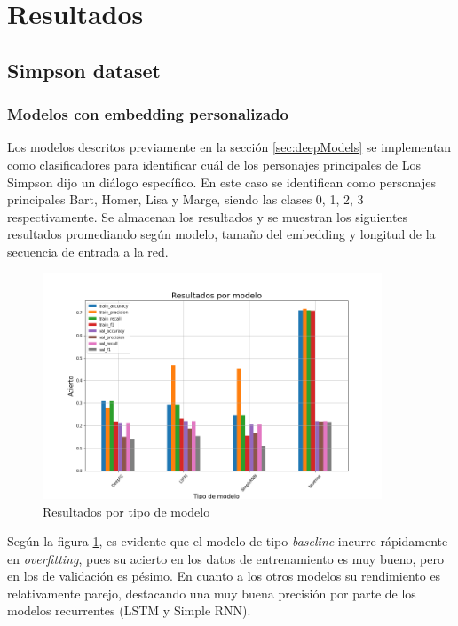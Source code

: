 \section{Resultados}

\subsection{Simpson dataset}

\subsubsection{Modelos con embedding personalizado}

Los modelos descritos previamente en la sección \ref{sec:deepModels} se implementan como clasificadores para identificar cuál de los personajes principales de Los Simpson dijo un diálogo específico. En este caso se identifican como personajes principales Bart, Homer, Lisa y Marge, siendo las clases 0, 1, 2, 3 respectivamente. Se almacenan los resultados y se muestran los siguientes resultados promediando según modelo, tamaño del embedding y longitud de la secuencia de entrada a la red.\\

\begin{figure}[H]
    \centering
    \includegraphics[width=0.9\textwidth]{results/friends/deepModels/sim_res_deep_model.png}
    \caption{Resultados por tipo de modelo}
    \label{fig:sim_deep_model}
\end{figure}

Según la figura \ref{fig:sim_deep_model}, es evidente que el modelo de tipo \textit{baseline} incurre rápidamente en \textit{overfitting}, pues su acierto en los datos de entrenamiento es muy bueno, pero en los de validación es pésimo. En cuanto a los otros modelos su rendimiento es relativamente parejo, destacando una muy buena precisión por parte de los modelos recurrentes  (LSTM y Simple RNN).\\

